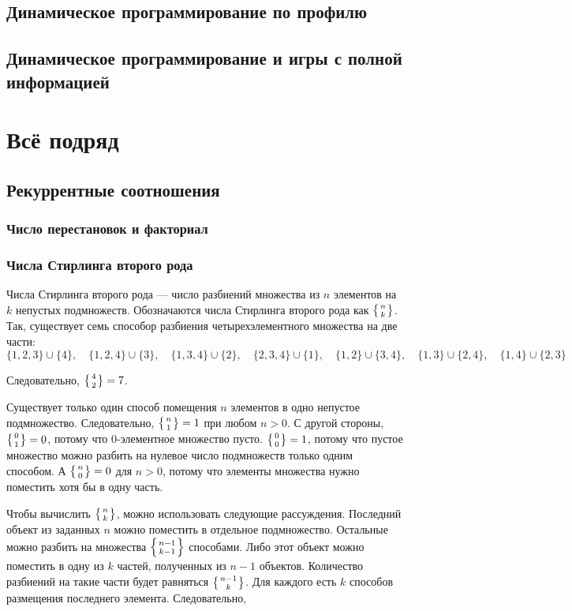 \documentclass[14pt,openany]{book}
\begin{document}
\chapter{Динамическое программирование по профилю}

\chapter{Динамическое программирование и игры с полной информацией}

\part{Всё подряд}

\chapter{Рекуррентные соотношения}



\section{Число перестановок и факториал}

\section{Числа Стирлинга второго рода}

Числа Стирлинга второго рода --- число разбиений множества из $n$ элементов на $k$
непустых подмножеств. Обозначаются числа Стирлинга второго рода как $\left\{{n}\atop{k}\right\}$.
Так, существует семь способор разбиения четырехэлементного множества на две части:
$$
  \{1,2,3\}\cup\{4\}, \quad \{1,2,4\}\cup\{3\}, \quad \{1,3,4\}\cup\{2\}, \quad \{2,3,4\}\cup\{1\},
  \quad \{1,2\}\cup\{3,4\}, \quad \{1,3\}\cup\{2,4\}, \quad \{1,4\}\cup\{2,3\}
$$

Следовательно, $\left\{{4}\atop{2}\right\} = 7$.

Существует только один способ помещения $n$ элементов в одно непустое подмножество.
Следовательно, $\left\{{n}\atop{1}\right\} = 1$ при любом $n>0$. С другой стороны, $\left\{{0}\atop{1}\right\} = 0$,
потому что $0$-элементное множество пусто. $\left\{{0}\atop{0}\right\} = 1$, потому что пустое множество
можно разбить на нулевое число подмножеств только одним способом. А $\left\{{n}\atop{0}\right\} = 0$ для
$n>0$, потому что элементы множества нужно поместить хотя бы в одну часть.

Чтобы вычислить $\left\{{n}\atop{k}\right\}$, можно использовать следующие рассуждения.
Последний объект из заданных $n$ можно поместить в отдельное подмножество. Остальные можно
разбить на множества $\left\{{n-1}\atop{k-1}\right\}$ способами. Либо этот объект можно поместить
в одну из $k$ частей, полученных из $n-1$ объектов. Количество разбиений на такие части
будет равняться $\left\{{n-1}\atop{k}\right\}$. Для каждого есть $k$ способов размещения последнего
элемента.
Следовательно,
\end{document}

